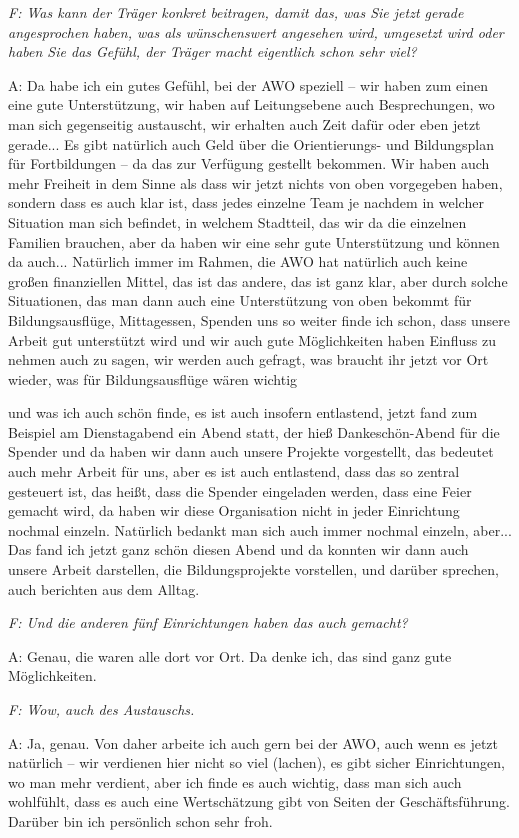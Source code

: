 \begin{linenumbers*}
\emph{F: Was kann der Träger konkret beitragen, damit das, was Sie jetzt gerade angesprochen haben, was als wünschenswert angesehen wird, umgesetzt wird oder haben Sie das Gefühl, der Träger macht eigentlich schon sehr viel?}

A: Da habe ich ein gutes Gefühl, bei der AWO speziell -- wir haben zum einen eine gute Unterstützung, wir haben auf Leitungsebene auch Besprechungen, wo man sich gegenseitig austauscht, wir erhalten auch Zeit dafür oder eben jetzt gerade... Es gibt natürlich auch Geld über die Orientierungs- und Bildungsplan für Fortbildungen -- da das zur Verfügung gestellt bekommen. Wir haben auch mehr Freiheit in dem Sinne als dass wir jetzt nichts von oben vorgegeben haben, sondern dass es auch klar ist, dass jedes einzelne Team je nachdem in welcher Situation man sich befindet, in welchem Stadtteil, das wir da die einzelnen Familien brauchen, aber da haben wir eine sehr gute Unterstützung und können da auch... Natürlich immer im Rahmen, die AWO hat natürlich auch keine großen finanziellen Mittel, das ist das andere, das ist ganz klar, aber durch solche Situationen, das man dann auch eine Unterstützung von oben bekommt für Bildungsausflüge, Mittagessen, Spenden uns so weiter finde ich schon, dass unsere Arbeit gut unterstützt wird und wir auch gute Möglichkeiten haben Einfluss zu nehmen auch zu sagen, wir werden auch gefragt, was braucht ihr jetzt vor Ort wieder, was für Bildungsausflüge wären wichtig 

und was ich auch schön finde, es ist auch insofern entlastend, jetzt fand zum Beispiel am Dienstagabend ein Abend statt, der hieß Dankeschön-Abend für die Spender und da haben wir dann auch unsere Projekte vorgestellt, das bedeutet auch mehr Arbeit für uns, aber es ist auch entlastend, dass das so zentral gesteuert ist, das heißt, dass die Spender eingeladen werden, dass eine Feier gemacht wird, da haben wir diese Organisation nicht in jeder Einrichtung nochmal einzeln. Natürlich bedankt man sich auch immer nochmal einzeln, aber... Das fand ich jetzt ganz schön diesen Abend und da konnten wir dann auch unsere Arbeit darstellen, die Bildungsprojekte vorstellen, und darüber sprechen, auch berichten aus dem Alltag.

\emph{F: Und die anderen fünf Einrichtungen haben das auch gemacht?}

A: Genau, die waren alle dort vor Ort. Da denke ich, das sind ganz gute Möglichkeiten.

\emph{F: Wow, auch des Austauschs.}

A: Ja, genau. Von daher arbeite ich auch gern bei der AWO, auch wenn es jetzt natürlich -- wir verdienen hier nicht so viel (lachen), es gibt sicher Einrichtungen, wo man mehr verdient, aber ich finde es auch wichtig, dass man sich auch wohlfühlt, dass es auch eine Wertschätzung gibt von Seiten der Geschäftsführung. Darüber bin ich persönlich schon sehr froh. 


\end{linenumbers*}
